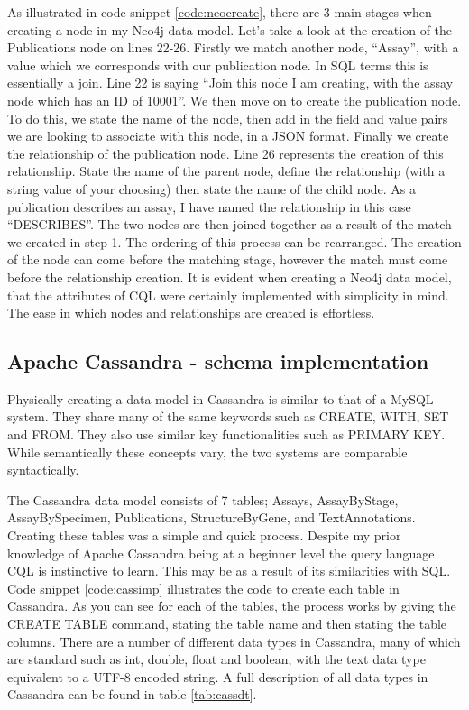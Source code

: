 As illustrated in code snippet \ref{code:neocreate}, there are 3 main stages when creating a node in my Neo4j data model. Let's take a look at the creation of the Publications node on lines 22-26. Firstly we match another node, ``Assay'', with a value which we corresponds with our publication node. In SQL terms this is essentially a join. Line 22 is saying ``Join this node I am creating, with the assay node which has an ID of 10001''. We then move on to create the publication node. To do this, we state the name of the node, then add in the field and value pairs we are looking to associate with this node, in a JSON format. Finally we create the relationship of the publication node. Line 26 represents the creation of this relationship. State the name of the parent node, define the relationship (with a string value of your choosing) then state the name of the child node. As a publication describes an assay, I have named the relationship in this case ``DESCRIBES''. The two nodes are then joined together as a result of the match we created in step 1. The ordering of this process can be rearranged. The creation of the node can come before the matching stage, however the match must come before the relationship creation. It is evident when creating a Neo4j data model, that the attributes of CQL were certainly implemented with simplicity in mind. The ease in which nodes and relationships are created is effortless.

\subsection{Apache Cassandra - schema implementation}
Physically creating a data model in Cassandra is similar to that of a MySQL system. They share many of the same keywords such as CREATE, WITH, SET and FROM. They also use similar key functionalities such as PRIMARY KEY. While semantically these concepts vary, the two systems are comparable syntactically.

The Cassandra data model consists of 7 tables; Assays, AssayByStage, AssayBySpecimen, Publications, StructureByGene, and TextAnnotations. Creating these tables was a simple and quick process. Despite my prior knowledge of Apache Cassandra being at a beginner level the query language CQL is instinctive to learn. This may be as a result of its similarities with SQL. Code snippet \ref{code:cassimp} illustrates the code to create each table in Cassandra. As you can see for each of the tables, the process works by giving the CREATE TABLE command, stating the table name and then stating the table columns. There are a number of different data types in Cassandra, many of which are standard such as int, double, float and boolean, with the text data type equivalent to a UTF-8 encoded string. A full description of all data types in Cassandra can be found in table \ref{tab:cassdt}.

